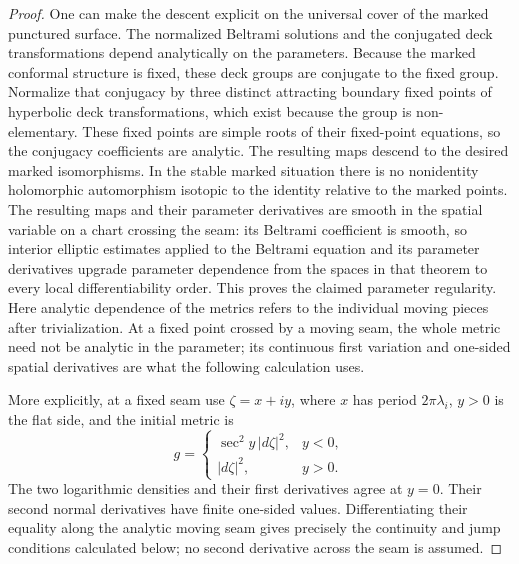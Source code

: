 \begin{proof}
One can make the descent explicit on the universal cover of the marked
punctured surface. The normalized Beltrami solutions and the conjugated
deck transformations depend analytically on the parameters. Because
the marked conformal structure is fixed, these deck groups are conjugate
to the fixed group. Normalize that conjugacy by three distinct attracting
boundary fixed points of hyperbolic deck transformations, which exist
because the group is non-elementary. These fixed points are simple roots
of their fixed-point equations, so the conjugacy coefficients are analytic.
The resulting maps descend to the desired marked isomorphisms. In the
stable marked situation there is no nonidentity holomorphic automorphism
isotopic to the identity relative to the marked points. The resulting
maps and their parameter derivatives are smooth in the spatial variable
on a chart crossing the seam: its Beltrami coefficient is smooth, so
interior elliptic estimates applied to the Beltrami equation and its
parameter derivatives upgrade parameter dependence from the spaces in
that theorem to every local differentiability order. This proves the
claimed parameter regularity. Here analytic dependence of the metrics
refers to the individual moving pieces after trivialization. At a fixed
point crossed by a moving seam, the whole metric need not be analytic in
the parameter; its continuous first variation and one-sided spatial
derivatives are what the following calculation uses.

More explicitly, at a fixed seam use $\zeta=x+iy$, where $x$ has period
$2\pi\lambda_i$, $y>0$ is the flat side, and the initial metric is
\[
 g=\begin{cases}\sec^2y\,|d\zeta|^2,&y<0,\\
                  |d\zeta|^2,&y>0.
   \end{cases}
\]
The two logarithmic densities and their first derivatives agree at
$y=0$. Their second normal derivatives have finite one-sided values.
Differentiating their equality along the analytic moving seam gives
precisely the continuity and jump conditions calculated below; no
second derivative across the seam is assumed.
\end{proof}

